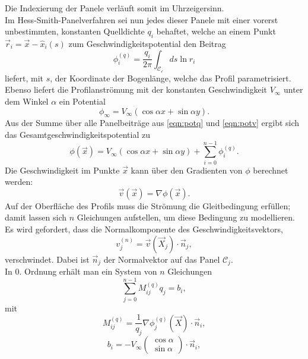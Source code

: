 Die Indexierung der Panele verläuft somit im Uhrzeigersinn. \\
Im Hess-Smith-Panelverfahren sei nun jedes dieser Panele mit einer vorerst unbestimmten, konstanten Quelldichte $q_i$ behaftet, welche an einem Punkt $\vec r_i =  \vec x - \hat x_i(s)$ zum Geschwindigkeitspotential den Beitrag
\begin{equation}
\label{eqn:potq}
\phi_i^{(q)} =  \frac{q_i}{2 \pi } \int_{\mathcal{C_i}} ds \ln r_i
\end{equation}
liefert, mit $s$, der Koordinate der Bogenlänge, welche das Profil parametrisiert. \\
Ebenso liefert die Profilanströmung mit der konstanten Geschwindigkeit $V_{\infty}$ unter dem Winkel $\alpha $ ein Potential
\begin{equation}
\label{eqn:potv}
\phi_{\infty} =  V_{\infty} (\cos \alpha x + \sin \alpha y).
\end{equation}
Aus der Summe über alle Panelbeiträge aus \eqref{eqn:potq} und \eqref{eqn:potv} ergibt sich das Gesamtgeschwindigkeitspotential zu
\begin{equation}
\label{eqn:potnovortex}
\phi(\vec x) =  V_{\infty} (\cos \alpha x + \sin \alpha y) + \sum_{i=0}^{n-1} \phi_i^{(q)}.
\end{equation}
Die Geschwindigkeit im Punkte $\vec x$  kann über den Gradienten von $\phi$ berechnet werden:
\begin{equation}
\vec v ( \vec x) =  \nabla  \phi (\vec x).
\end{equation}
Auf der Oberfläche des Profils muss die Strömung die Gleitbedingung erfüllen; damit lassen sich $n$ Gleichungen aufstellen, um diese Bedingung zu modellieren. Es wird gefordert, dass die Normalkomponente des Geschwindigkeitsvektors,
\begin{equation}
v_j^{(n)} =  \vec v(\vec X_j) \cdot \vec n_j,
\end{equation}
verschwindet. Dabei ist $\vec n_j$ der Normalvektor auf das Panel $\mathcal{C}_j$.\\
In 0. Ordnung erhält man ein System von $n$ Gleichungen
\begin{equation}
\label{eq:lgls1}
\sum_{j=0}^{n-1} M_{ij}^{(q)}q_j =  b_i,
\end{equation}
mit
\begin{equation}
M_{ij}^{(q)} = \frac{1}{q_j} \nabla \phi_j^{(q)} (\vec X) \cdot \vec n_i,
\end{equation}
\begin{equation}
b_i =  -V_{\infty} \left( \begin{matrix} \cos \alpha \\ \sin \alpha \end{matrix} \right) \cdot \vec n_i,
\end{equation}
